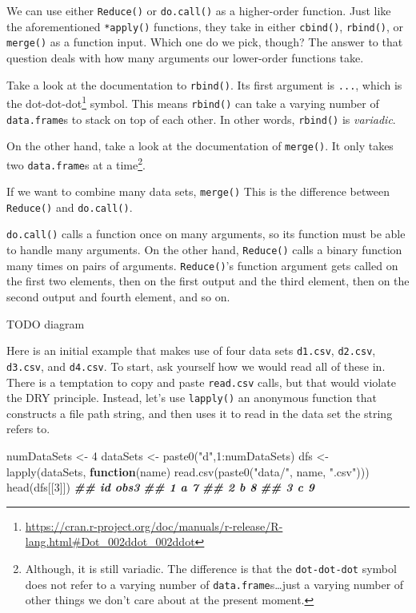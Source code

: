 \documentclass[
  12pt,
]{krantz}
\makeatletter
\newenvironment{Shaded}{\begin{snugshade}}{\end{snugshade}}
\newcommand{\ControlFlowTok}[1]{\textcolor[rgb]{0.27,0.27,0.27}{\textbf{#1}}}
\newcommand{\DecValTok}[1]{\textcolor[rgb]{0.06,0.06,0.06}{#1}}
\newcommand{\DocumentationTok}[1]{\textcolor[rgb]{0.37,0.37,0.37}{\textbf{\textit{#1}}}}
\newcommand{\FunctionTok}[1]{\textcolor[rgb]{0,0,0}{#1}}
\newcommand{\NormalTok}[1]{#1}
\newcommand{\OtherTok}[1]{\textcolor[rgb]{0.37,0.37,0.37}{#1}}
\newcommand{\SpecialCharTok}[1]{\textcolor[rgb]{0,0,0}{#1}}
\newcommand{\StringTok}[1]{\textcolor[rgb]{0.5,0.5,0.5}{#1}}
\renewcommand{\href}[2]{#2\footnote{\url{#1}}}
\newenvironment{kframe}{%
\medskip{}
\setlength{\fboxsep}{.8em}
 \def\at@end@of@kframe{}%
 \ifinner\ifhmode%
  \def\at@end@of@kframe{\end{minipage}}%
  \begin{minipage}{\columnwidth}%
 \fi\fi%
 \def\FrameCommand##1{\hskip\@totalleftmargin \hskip-\fboxsep
 \colorbox{shadecolor}{##1}\hskip-\fboxsep
     \hskip-\linewidth \hskip-\@totalleftmargin \hskip\columnwidth}%
 \MakeFramed {\advance\hsize-\width
   \@totalleftmargin\z@ \linewidth\hsize
   \@setminipage}}%
 {\par\unskip\endMakeFramed%
 \at@end@of@kframe}
\renewenvironment{Shaded}{\begin{kframe}}{\end{kframe}}
\makeatother
\begin{document}
We can use either \texttt{Reduce()} or \texttt{do.call()} as a higher-order function. Just like the aforementioned \texttt{*apply()} functions, they take in either \texttt{cbind()}, \texttt{rbind()}, or \texttt{merge()} as a function input. Which one do we pick, though? The answer to that question deals with how many arguments our lower-order functions take.

Take a look at the documentation to \texttt{rbind()}. Its first argument is \texttt{...}, which is the \href{https://cran.r-project.org/doc/manuals/r-release/R-lang.html\#Dot_002ddot_002ddot}{dot-dot-dot} symbol. This means \texttt{rbind()} can take a varying number of \texttt{data.frame}s to stack on top of each other. In other words, \texttt{rbind()} is \emph{variadic}.

On the other hand, take a look at the documentation of \texttt{merge()}. It only takes two \texttt{data.frame}s at a time\footnote{Although, it is still variadic. The difference is that the \texttt{dot-dot-dot} symbol does not refer to a varying number of \texttt{data.frame}s\ldots just a varying number of other things we don't care about at the present moment.}.

If we want to combine many data sets, \texttt{merge()} This is the difference between \texttt{Reduce()} and \texttt{do.call()}.

\texttt{do.call()} calls a function once on many arguments, so its function must be able to handle many arguments. On the other hand, \texttt{Reduce()} calls a binary function many times on pairs of arguments. \texttt{Reduce()}'s function argument gets called on the first two elements, then on the first output and the third element, then on the second output and fourth element, and so on.

TODO diagram

Here is an initial example that makes use of four data sets \texttt{d1.csv}, \texttt{d2.csv}, \texttt{d3.csv}, and \texttt{d4.csv}. To start, ask yourself how we would read all of these in. There is a temptation to copy and paste \texttt{read.csv} calls, but that would violate the DRY principle. Instead, let's use \texttt{lapply()} an anonymous function that constructs a file path string, and then uses it to read in the data set the string refers to.

\begin{Shaded}
\begin{Highlighting}[]
\NormalTok{numDataSets }\OtherTok{\textless{}{-}} \DecValTok{4}
\NormalTok{dataSets }\OtherTok{\textless{}{-}} \FunctionTok{paste0}\NormalTok{(}\StringTok{"d"}\NormalTok{,}\DecValTok{1}\SpecialCharTok{:}\NormalTok{numDataSets)}
\NormalTok{dfs }\OtherTok{\textless{}{-}} \FunctionTok{lapply}\NormalTok{(dataSets, }
              \ControlFlowTok{function}\NormalTok{(name) }\FunctionTok{read.csv}\NormalTok{(}\FunctionTok{paste0}\NormalTok{(}\StringTok{"data/"}\NormalTok{, name, }\StringTok{".csv"}\NormalTok{)))}
\FunctionTok{head}\NormalTok{(dfs[[}\DecValTok{3}\NormalTok{]])}
\DocumentationTok{\#\#   id obs3}
\DocumentationTok{\#\# 1  a    7}
\DocumentationTok{\#\# 2  b    8}
\DocumentationTok{\#\# 3  c    9}
\end{Highlighting}
\end{Shaded}
\end{document}
